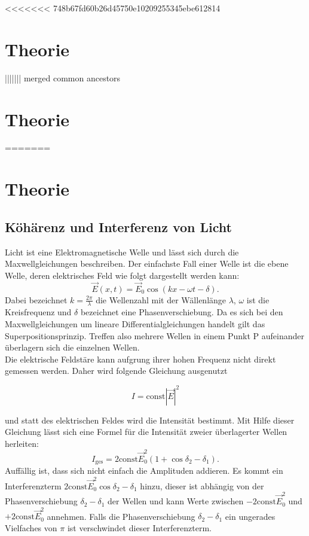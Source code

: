 <<<<<<< 748b67fd60b26d45750e10209255345ebe612814
\section{Theorie}
\label{sec:Theorie}

||||||| merged common ancestors
\section{Theorie}
\label{sec:Theorie}

=======
\section{Theorie}
\subsection{Köhärenz und Interferenz von Licht}
Licht ist eine Elektromagnetische Welle und lässt sich durch die Maxwellgleichungen
beschreiben. Der einfachste Fall einer Welle ist die ebene Welle, deren elektrisches Feld
wie folgt dargestellt werden kann:
\begin{equation}
  \vec{E}(x,t)=\vec{E}_{0}\cos(kx-\omega t -\delta)
  \label{eqn:eben}.
\end{equation}
Dabei bezeichnet $k=\frac{2\pi}{\lambda}$ die Wellenzahl mit der Wällenlänge $\lambda$,
$\omega$ ist die Kreisfrequenz und $\delta$ bezeichnet eine Phasenverschiebung.
Da es sich bei den Maxwellgleichungen um lineare Differentialgleichungen handelt
gilt das Superpositionsprinzip. Treffen also mehrere Wellen in einem Punkt P
aufeinander überlagern sich die einzelnen Wellen.\\
Die elektrische Feldstäre kann aufgrung ihrer hohen Frequenz %
nicht direkt gemessen werden. Daher wird folgende Gleichung ausgenutzt

\begin{equation}
  I=\text{const} |\vec{E}|^{2}
  \label{eqn:intensität}
\end{equation}

und statt des elektrischen Feldes wird die Intensität bestimmt.
\label{sec:Theorie}
Mit Hilfe dieser Gleichung lässt sich eine Formel für die Intensität zweier
überlagerter Wellen herleiten:
\begin{equation}
  I_{\text{ges}}=2\text{const}\vec{E}_{0}^{2}(1+\cos{\delta_{2}-\delta_{1}})
  \label{eqn:iges}.
\end{equation}
Auffällig ist, dass sich nicht einfach die Amplituden addieren. Es kommt ein Interferenzterm
$2\text{const}\vec{E}_{0}^{2}\cos{\delta_{2}-\delta_{1}}$ hinzu, dieser ist abhängig von
der Phasenverschiebung $\delta_{2}-\delta_{1}$ der Wellen und kann Werte zwischen
$-2\text{const}\vec{E}_{0}^{2}$ und $+2\text{const}\vec{E}_{0}^{2}$ annehmen.
Falls die Phasenverschiebung $\delta_{2}-\delta_{1}$ ein ungerades Vielfaches von
$\pi$ ist verschwindet dieser Interferenzterm.\\

